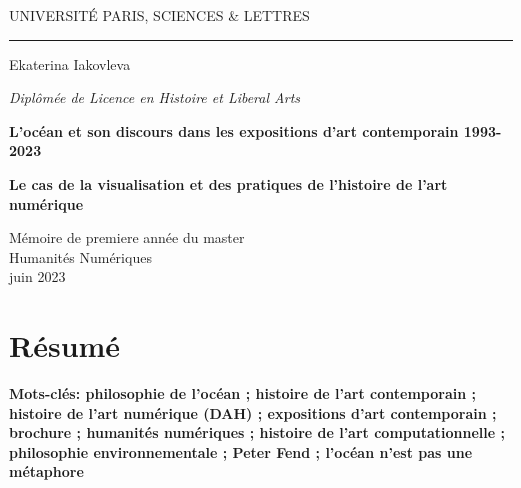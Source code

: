 \documentclass[a4paper, twoside, 12pt]{book}
\begin{document}
\frontmatter



\begin{titlepage}
\begin{center}

\bigskip

\begin{large}
UNIVERSITÉ PARIS, SCIENCES \& LETTRES
\end{large}

\begin{center}\rule{2cm}{0.02cm}\end{center}

\bigskip
\bigskip
\bigskip
\begin{Large}
Ekaterina Iakovleva\\
\end{Large}
\begin{normalsize}
\textit{Diplômée de Licence en  Histoire et Liberal Arts}\\
\end{normalsize}

\bigskip
\bigskip
\bigskip

\begin{Huge}
\textbf{L'océan et son discours dans les expositions d'art contemporain 1993-2023}\\
\end{Huge}

\bigskip
\bigskip
\begin{Large}
 \textbf{Le cas de la visualisation et des pratiques de l'histoire de l'art numérique}\\
\end{Large}

\bigskip
\bigskip
\bigskip
\vfill

\begin{large}
Mémoire de premiere année du master\\
\og Humanités Numériques \fg{} \\
\bigskip
juin 2023
\end{large}

\end{center}
\end{titlepage}

\section*{Résumé}


\medskip

\textbf{Mots-clés: philosophie de l'océan ; histoire de l'art contemporain ; histoire de l'art numérique (DAH) ; expositions d'art contemporain ; brochure ; humanités numériques ; histoire de l'art computationnelle ; philosophie environnementale ; Peter Fend ; l'océan n'est pas une métaphore}
\end{document}
